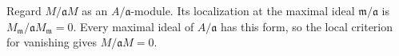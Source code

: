 Regard $M/\mathfrak aM$ as an $A/\mathfrak a$-module. Its localization at the maximal ideal $\mathfrak m/\mathfrak a$ is $M_{\mathfrak m}/\mathfrak aM_{\mathfrak m}=0$. Every maximal ideal of $A/\mathfrak a$ has this form, so the local criterion for vanishing gives $M/\mathfrak aM=0$.
